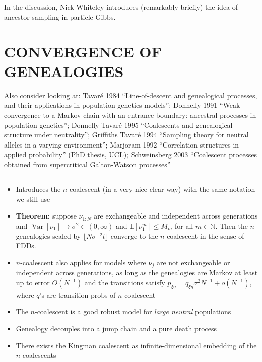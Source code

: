 \documentclass{article}
\newcommand{\E}{\mathbb{E}}
\newcommand{\V}{\operatorname{Var}}
\begin{document}
\subsection*{\cite{whiteley2010}}
In the discussion, Nick Whiteley introduces (remarkably briefly) the idea of ancestor sampling in particle Gibbs.





\section*{CONVERGENCE OF GENEALOGIES}

Also consider looking at: 
Tavar\'e 1984 ``Line-of-descent and genealogical processes, and their applications in population genetics models''; 
Donnelly 1991 ``Weak convergence to  a Markov chain with an entrance boundary: ancestral processes in population genetics''; 
Donnelly Tavar\'e 1995 ``Coalescents and genealogical structure under neutrality''; 
Griffiths Tavar\'e 1994 ``Sampling theory for neutral alleles in a varying environment''; 
Marjoram 1992 ``Correlation structures in applied probability'' (PhD thesis, UCL);
Schweinsberg 2003 ``Coalescent processes obtained from supercritical Galton-Watson processes''

\subsection*{\cite{kingman1982gene}}
\begin{itemize}
\item Introduces the $n$-coalescent (in a very nice clear way) with the same notation we still use
\item \textbf{Theorem:} suppose $\nu_{1:N}$ are exchangeable and independent across generations and $\V[\nu_1]\to\sigma^2 \in (0,\infty)$ and $\E[\nu_1^m] \leq M_m$ for all $m\in\mathbb{N}$. Then the $n$-genealogies scaled by $\lfloor N\sigma^{-2}t \rfloor$ converge to the $n$-coalescent in the sense of FDDs.
\item $n$-coalescent also applies for models where $\nu_j$ are not exchangeable or independent across generations, as long as the genealogies are Markov at least up to error $O(N^{-1})$ and the transitions satisfy $p_{\xi\eta} = q_{\xi\eta}\sigma^2 N^{-1} + o(N^{-1})$, where $q$'s are transition probs of $n$-coalescent
\item The $n$-coalescent is a good robust model for \emph{large neutral} populations
\item Genealogy decouples into a jump chain and a pure death process
\item There exists the Kingman coalescent as infinite-dimensional embedding of the $n$-coalescents
\end{itemize}
\end{document}
